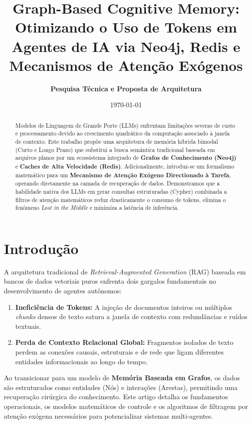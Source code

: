 \documentclass[11pt,a4paper]{article}
\title{\textbf{Graph-Based Cognitive Memory: Otimizando o Uso de Tokens em Agentes de IA via Neo4j, Redis e Mecanismos de Atenção Exógenos}}
\author{\textbf{Pesquisa Técnica e Proposta de Arquitetura}}
\date{\today}
\begin{document}
\maketitle

\begin{abstract}
Modelos de Linguagem de Grande Porte (LLMs) enfrentam limitações severas de custo e processamento devido ao crescimento quadrático da computação associado à janela de contexto. Este trabalho propõe uma arquitetura de memória híbrida bimodal (Curto e Longo Prazo) que substitui a busca semântica tradicional baseada em arquivos planos por um ecossistema integrado de \textbf{Grafos de Conhecimento (Neo4j)} e \textbf{Caches de Alta Velocidade (Redis)}. Adicionalmente, introduz-se um formalismo matemático para um \textbf{Mecanismo de Atenção Exógeno Directionado à Tarefa}, operando diretamente na camada de recuperação de dados. Demonstramos que a habilidade nativa dos LLMs em gerar consultas estruturadas (Cypher) combinada a filtros de atenção matemáticos reduz drasticamente o consumo de tokens, elimina o fenômeno \textit{Lost in the Middle} e minimiza a latência de inferência.
\end{abstract}

\section{Introdução}
A arquitetura tradicional de \textit{Retrieval-Augmented Generation} (RAG) baseada em bancos de dados vetoriais puros enfrenta dois gargalos fundamentais no desenvolvimento de agentes autônomos:
\begin{enumerate}
    \item \textbf{Ineficiência de Tokens:} A injeção de documentos inteiros ou múltiplos \textit{chunks} densos de texto satura a janela de contexto com redundâncias e ruídos textuais.
    \item \textbf{Perda de Contexto Relacional Global:} Fragmentos isolados de texto perdem as conexões causais, estruturais e de rede que ligam diferentes entidades informacionais ao longo do tempo.
\end{enumerate}

Ao transicionar para um modelo de \textbf{Memória Baseada em Grafos}, os dados são estruturados como entidades (Nós) e interações (Arestas), permitindo uma recuperação cirúrgica do conhecimento. Este artigo detalha os fundamentos operacionais, os modelos matemáticos de controle e os algoritmos de filtragem por atenção exógena necessários para potencializar sistemas multi-agentes.
\end{document}
